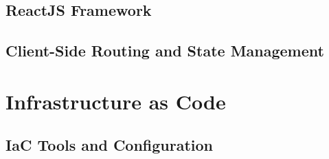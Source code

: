 \subsection{ReactJS Framework}
\label{subsec:reactjs-framework}

\subsection{Client-Side Routing and State Management}
\label{subsec:client-side-routing-state}

\section{Infrastructure as Code}
\label{sec:infrastructure-as-code}

\subsection{IaC Tools and Configuration}
\label{subsec:iac-tools-configuration}

